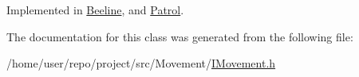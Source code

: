 Implemented in \hyperlink{classBeeline_a1af3f739bafa5a305e39f3b7f278b79d}{Beeline}, and \hyperlink{classPatrol_adb1a2e74fc26e331a279262dc1c5b37e}{Patrol}.



The documentation for this class was generated from the following file\+:\begin{DoxyCompactItemize}
\item 
/home/user/repo/project/src/\+Movement/\hyperlink{IMovement_8h}{I\+Movement.\+h}\end{DoxyCompactItemize}
